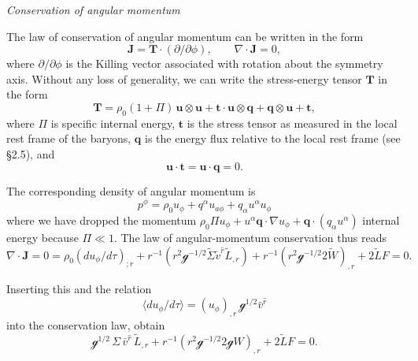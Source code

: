 \bigskip
\noindent\textit{Conservation of angular momentum}

\medskip
The law of conservation of angular momentum can be written in the form
\begin{equation}
\mathbf{J} = \mathbf{T} \cdot (\partial/\partial\phi),
\qquad \nabla \cdot \mathbf{J} = 0,
\tag{5.6.3}
\end{equation}
where $\partial/\partial\phi$ is the Killing vector associated with rotation about the symmetry
axis.  Without any loss of generality, we can write the stress-energy tensor $\mathbf{T}$ in
the form
\begin{equation}
\mathbf{T} = \rho_0 (1+\Pi)\,\mathbf{u} \otimes \mathbf{u}
+ \mathbf{t} \cdot \mathbf{u} \otimes \mathbf{q}
+ \mathbf{q} \otimes \mathbf{u} + \mathbf{t},
\tag{5.6.4a}
\end{equation}
where $\Pi$ is specific internal energy, $\mathbf{t}$ is the stress tensor as measured in the local
rest frame of the baryons, $\mathbf{q}$ is the energy flux relative to the local rest frame
(see \S2.5), and
\begin{equation}
\mathbf{u} \cdot \mathbf{t} = \mathbf{u} \cdot \mathbf{q} = 0.
\tag{5.6.4b}
\end{equation}

The corresponding density of angular momentum is
\begin{equation}
p^\phi = \rho_0 u_\phi + q^\alpha u_{a\phi} + q_\alpha u^\alpha u_\phi
\tag{5.6.5}
\end{equation}
where we have dropped the momentum $\rho_0\Pi u_\phi + u^\alpha \mathbf{q} \cdot \nabla u_\phi + \mathbf{q} \cdot (q_\alpha u^\alpha)$
internal energy because $\Pi \ll 1$.  The law of angular-momentum conservation thus
reads
\begin{equation}
\nabla \cdot \mathbf{J} = 0 = \rho_0 (du_\phi/d\tau)_{;r} + r^{-1}(r^2 \mathscr{g}^{-1/2} \tilde{\Sigma} \tilde{v}^{\hat{r}} \tilde{L}_{,r})
+ r^{-1}(r^2 \mathscr{g}^{-1/2} 2\tilde{W})_{,r} + 2\tilde{L}F = 0.
\end{equation}

Inserting this and the relation
\begin{equation}
\langle du_\phi/d\tau \rangle = (u_\phi)_{,r}\, \mathscr{g}^{1/2} \bar{v}^{\hat{r}}
\tag{5.6.5}
\end{equation}
into the conservation law, obtain
\begin{equation}
\mathscr{g}^{1/2}\,\Sigma\,\bar{v}^{\hat{r}}\,\tilde{L}_{,r}
+ r^{-1}(r^2\mathscr{g}^{-1/2}2\mathscr{g}W)_{,r} + 2\tilde{L}F = 0.
\tag{5.6.5}
\end{equation}

